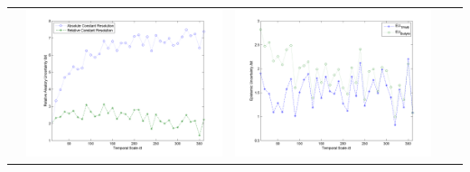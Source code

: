 \documentclass[11pt]{article}
\begin{document}
\begin{table}[H]
{\begin{tabular}{c  c   c   c c }
&\begin{minipage}{.4\textwidth}\includegraphics[width=\linewidth]{resultgraph/02414500AU.png}\end{minipage}
&\begin{minipage}{.4\textwidth}\includegraphics[width=\linewidth]{resultgraph/02414500EU.png}\end{minipage}
\\

\end{tabular}}
\end{table}
\end{document}
